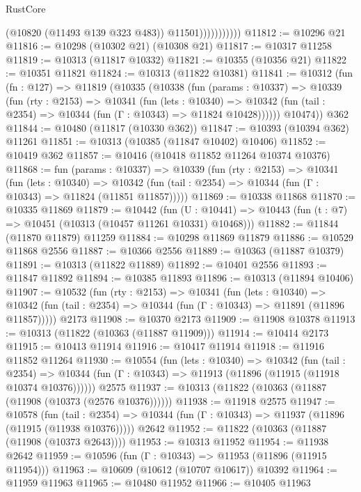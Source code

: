 \begin{lexlean}{RustCore}
\begin{coremodule}
                          (@10820 (@11493 @139 @323 @483))
                          @11501)))))))))))
@11812 := @10296 @21
@11816 := @10298 (@10302 @21) (@10308 @21)
@11817 := @10317 @11258
@11819 := @10313 (@11817 @10332)
@11821 := @10355 (@10356 @21)
@11822 := @10351 @11821
@11824 := @10313 (@11822 @10381)
@11841 := @10312
    (fun (fn : @127) =>
    @11819
      (@10335
        (@10338
          (fun (params : @10337) =>
          @10339
            (fun (rty : @2153) =>
            @10341
              (fun (lets : @10340) =>
              @10342 (fun (tail : @2354) => @10344 (fun (Γ : @10343) => @11824 @10428))))))
        @10474))
    @362
@11844 := @10480 (@11817 (@10330 @362))
@11847 := @10393 (@10394 @362) @11261
@11851 := @10313 (@10385 (@11847 @10402) @10406)
@11852 := @10419 @362
@11857 := @10416 (@10418 @11852 @11264 @10374 @10376)
@11868 := fun (params : @10337) =>
  @10339
    (fun (rty : @2153) =>
    @10341
      (fun (lets : @10340) =>
      @10342 (fun (tail : @2354) => @10344 (fun (Γ : @10343) => @11824 (@11851 @11857)))))
@11869 := @10338 @11868
@11870 := @10335 @11869
@11879 := @10442
    (fun (U : @10441) => @10443 (fun (t : @7) => @10451 (@10313 (@10457 @11261 @10331) @10468)))
@11882 := @11844 (@11870 @11879) @11259
@11884 := @10298 @11869 @11879
@11886 := @10529 @11868 @2556
@11887 := @10366 @2556
@11889 := @10363 (@11887 @10379)
@11891 := @10313 (@11822 @11889)
@11892 := @10401 @2556
@11893 := @11847 @11892
@11894 := @10385 @11893
@11896 := @10313 (@11894 @10406)
@11907 := @10532
    (fun (rty : @2153) =>
    @10341
      (fun (lets : @10340) =>
      @10342 (fun (tail : @2354) => @10344 (fun (Γ : @10343) => @11891 (@11896 @11857)))))
    @2173
@11908 := @10370 @2173
@11909 := @11908 @10378
@11913 := @10313 (@11822 (@10363 (@11887 @11909)))
@11914 := @10414 @2173
@11915 := @10413 @11914
@11916 := @10417 @11914
@11918 := @11916 @11852 @11264
@11930 := @10554
    (fun (lets : @10340) =>
    @10342
      (fun (tail : @2354) =>
      @10344 (fun (Γ : @10343) => @11913 (@11896 (@11915 (@11918 @10374 @10376))))))
    @2575
@11937 := @10313 (@11822 (@10363 (@11887 (@11908 (@10373 (@2576 @10376))))))
@11938 := @11918 @2575
@11947 := @10578
    (fun (tail : @2354) => @10344 (fun (Γ : @10343) => @11937 (@11896 (@11915 (@11938 @10376)))))
    @2642
@11952 := @11822 (@10363 (@11887 (@11908 (@10373 @2643))))
@11953 := @10313 @11952
@11954 := @11938 @2642
@11959 := @10596 (fun (Γ : @10343) => @11953 (@11896 (@11915 @11954)))
@11963 := @10609 (@10612 (@10707 @10617)) @10392
@11964 := @11959 @11963
@11965 := @10480 @11952
@11966 := @10405 @11963

\end{coremodule}
\end{lexlean}
